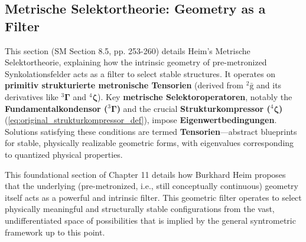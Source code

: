 \documentclass[12pt]{article}
\newcommand{\kompositionsfeld}{{}^2\bar{\mathrm{g}}}
\newcommand{\fundamentalkondensor}{{}^3\bm{\Gamma}}
\newcommand{\strukturkompressor}{{}^4\bm{\zeta}}
\begin{document}
\subsection{Metrische Selektortheorie: Geometry as a Filter}
\label{sec:selektortheorie}

This section (SM Section 8.5, pp. 253-260) details Heim's Metrische Selektortheorie, explaining how the intrinsic geometry of pre-metronized Synkolationsfelder acts as a filter to select stable structures. It operates on \textbf{primitiv strukturierte metronische Tensorien} (derived from \( \kompositionsfeld \) and its derivatives like \(\fundamentalkondensor\) and \(\strukturkompressor\)). Key \textbf{metrische Selektoroperatoren}, notably the \textbf{Fundamentalkondensor (\(\fundamentalkondensor\))} and the crucial \textbf{Strukturkompressor (\(\strukturkompressor\))} (\eqref{eq:original_strukturkompressor_def}), impose \textbf{Eigenwertbedingungen}. Solutions satisfying these conditions are termed \textbf{Tensorien}—abstract blueprints for stable, physically realizable geometric forms, with eigenvalues corresponding to quantized physical properties.

This foundational section of Chapter 11 details how Burkhard Heim proposes that the underlying (pre-metronized, i.e., still conceptually continuous) geometry itself acts as a powerful and intrinsic filter. This geometric filter operates to select physically meaningful and structurally stable configurations from the vast, undifferentiated space of possibilities that is implied by the general syntrometric framework up to this point.
\end{document}
